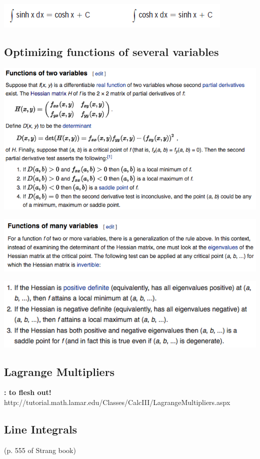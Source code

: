 \documentclass{article}
\begin{document}
\includegraphics[scale=0.65]{integrals2}

\subsection{Optimizing functions of several variables}

\includegraphics[scale=0.65]{hessian1}

\includegraphics[scale=0.65]{hessian2}

\includegraphics[scale=0.65]{hessian3}

\subsection{Lagrange Multipliers} \textbf{: to flesh out!} http://tutorial.math.lamar.edu/Classes/CalcIII/LagrangeMultipliers.aspx

\subsection{Line Integrals} (p. 555 of Strang book)
\end{document}
